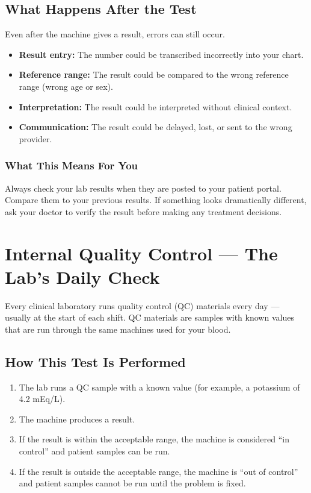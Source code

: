 \subsection{What Happens After the Test}

Even after the machine gives a result, errors can still occur.

\begin{itemize}
    \item \textbf{Result entry:} The number could be transcribed incorrectly into your chart.
    \item \textbf{Reference range:} The result could be compared to the wrong reference range (wrong age or sex).
    \item \textbf{Interpretation:} The result could be interpreted without clinical context.
    \item \textbf{Communication:} The result could be delayed, lost, or sent to the wrong provider.
\end{itemize}

\subsubsection{What This Means For You}

Always check your lab results when they are posted to your patient portal. Compare them to your previous results. If something looks dramatically different, ask your doctor to verify the result before making any treatment decisions.

\clearpage
\section{Internal Quality Control --- The Lab's Daily Check}

Every clinical laboratory runs quality control (QC) materials every day --- usually at the start of each shift. QC materials are samples with known values that are run through the same machines used for your blood.

\subsection{How This Test Is Performed}

\begin{enumerate}
    \item The lab runs a QC sample with a known value (for example, a potassium of 4.2 mEq/L).
    \item The machine produces a result.
    \item If the result is within the acceptable range, the machine is considered ``in control'' and patient samples can be run.
    \item If the result is outside the acceptable range, the machine is ``out of control'' and patient samples cannot be run until the problem is fixed.
\end{enumerate}

